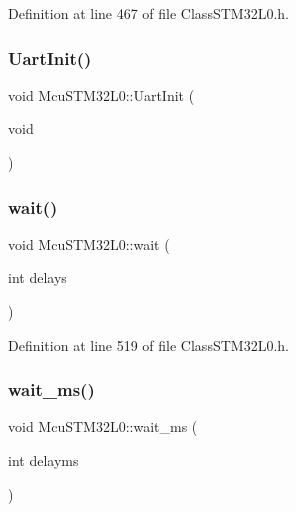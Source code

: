 Definition at line 467 of file Class\+S\+T\+M32\+L0.\+h.

\mbox{\label{class_mcu_s_t_m32_l0_a9b7a19473391bfd637658520b7240173}} 
\subsubsection{\texorpdfstring{Uart\+Init()}{UartInit()}}
{\footnotesize\ttfamily void Mcu\+S\+T\+M32\+L0\+::\+Uart\+Init (\begin{DoxyParamCaption}\item[{void}]{ }\end{DoxyParamCaption})}

\mbox{\label{class_mcu_s_t_m32_l0_a2f73d46dfb58e1145838988645e20045}} 
\subsubsection{\texorpdfstring{wait()}{wait()}}
{\footnotesize\ttfamily void Mcu\+S\+T\+M32\+L0\+::wait (\begin{DoxyParamCaption}\item[{int}]{delays }\end{DoxyParamCaption})\hspace{0.3cm}{\ttfamily [inline]}}



Definition at line 519 of file Class\+S\+T\+M32\+L0.\+h.

\mbox{\label{class_mcu_s_t_m32_l0_aa5c59fb3cc40e456c8ca2dfb573d2db5}} 
\subsubsection{\texorpdfstring{wait\+\_\+ms()}{wait\_ms()}}
{\footnotesize\ttfamily void Mcu\+S\+T\+M32\+L0\+::wait\+\_\+ms (\begin{DoxyParamCaption}\item[{int}]{delayms }\end{DoxyParamCaption})\hspace{0.3cm}{\ttfamily [inline]}}




